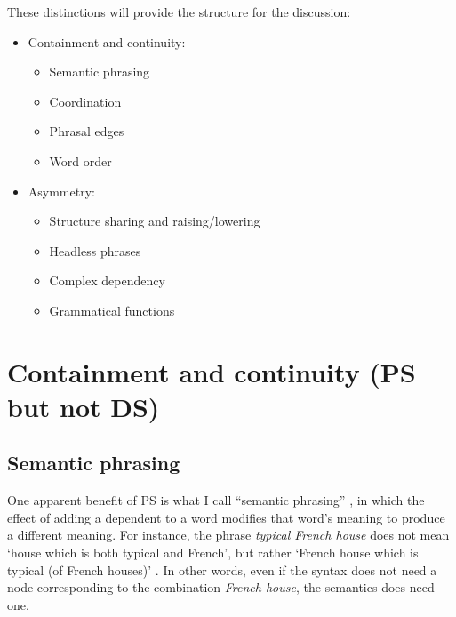 \documentclass[output=paper]{langscibook}
\begin{document}
These distinctions will provide the structure for the discussion:

\begin{itemize}
	\item  Containment and continuity:
	\begin{itemize}
		\item Semantic phrasing
		
		\item Coordination
		
		\item Phrasal edges
		
		\item Word order
	\end{itemize}

	\item Asymmetry:
	\begin{itemize}
		\item Structure sharing and raising/lowering
		
		\item Headless phrases
		
		\item Complex dependency
		
		\item Grammatical functions
	\end{itemize}
\end{itemize}


\section{Containment and continuity (PS but not DS)}
\label{sec:4}

\subsection{Semantic phrasing}
\label{sec:4.1}

One apparent benefit of PS is what I call ``semantic phrasing'' \citep[146–151]{Hudson90a-u}, in which the effect of adding a dependent to a word modifies that word’s meaning to produce a different meaning. For instance, the phrase \emph{typical French house} does not mean ‘house which is both typical and French’, but rather ‘French house which is typical (of French houses)’ \citep{Dahl80a}. In other words, even if the syntax does not need a node corresponding to the combination \emph{French house}, the semantics does need one.
\end{document}
